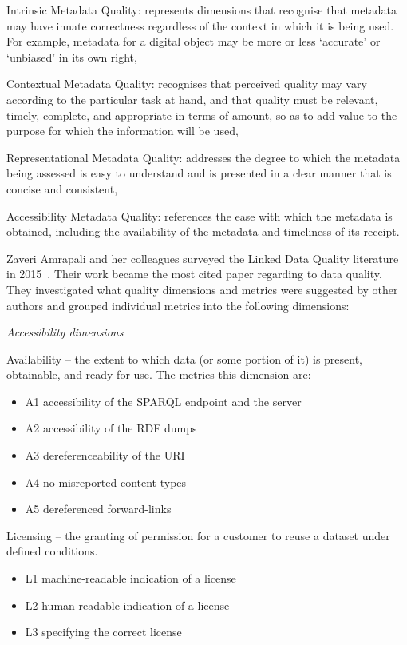 Intrinsic Metadata Quality: represents dimensions that recognise that metadata may have innate correctness regardless of the context in which it is being used. For example, metadata for a digital object may be more or less ‘accurate’ or ‘unbiased’ in its own right,

Contextual Metadata Quality: recognises that perceived quality may vary according to the particular task at hand, and that quality must be relevant, timely, complete, and appropriate in terms of amount, so as to add value to the purpose for which the information will be used,

Representational Metadata Quality: addresses the degree to which the metadata being assessed is easy to understand and is presented in a clear manner that is concise and consistent,

Accessibility Metadata Quality: references the ease with which the metadata is obtained, including the availability of the metadata and timeliness of its receipt.

Zaveri Amrapali and her colleagues surveyed the Linked Data Quality literature in 2015~\cite{zaveri2015}. Their work became the most cited paper regarding to data quality. They investigated what quality dimensions and metrics were suggested by other authors and grouped individual metrics into the following dimensions:

\emph{Accessibility dimensions}

Availability -- the extent to which data (or some portion of it) is present, obtainable, and ready for use. The metrics this dimension are:
\begin{itemize}
 \setlength{\parskip}{0pt}
 \setlength{\itemsep}{0pt plus 1pt}
 \item A1 accessibility of the SPARQL endpoint and the server
 \item A2 accessibility of the RDF dumps
 \item A3 dereferenceability of the URI
 \item A4 no misreported content types
 \item A5 dereferenced forward-links
\end{itemize}

Licensing -- the granting of permission for a customer to reuse a dataset under defined conditions.
\begin{itemize}
 \setlength{\parskip}{0pt}
 \setlength{\itemsep}{0pt plus 1pt}
 \item L1 machine-readable indication of a license
 \item L2 human-readable indication of a license
 \item L3 specifying the correct license
\end{itemize}

